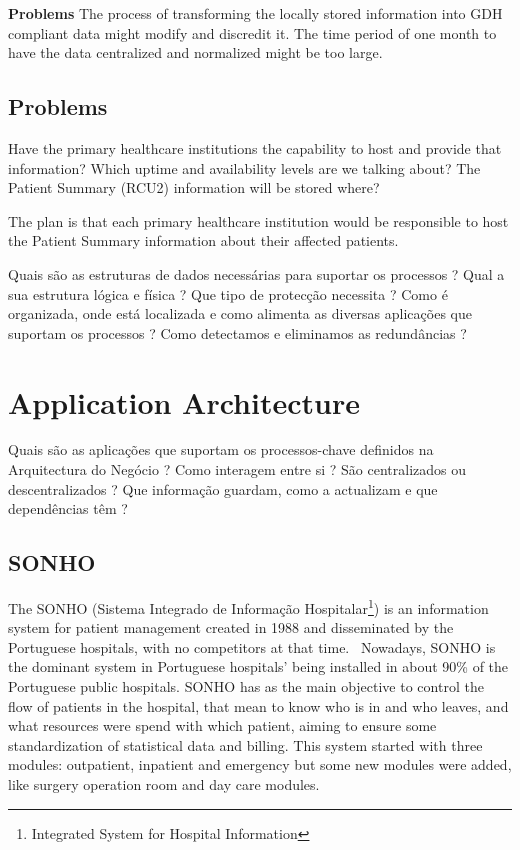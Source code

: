 \textbf{Problems}
The process of transforming the locally stored information into GDH compliant data might modify and discredit it.
The time period of one month to have the data centralized and normalized might be too large.

\subsection{Problems}
Have the primary healthcare institutions the capability to host and provide that information? Which uptime and availability levels are we talking about?
The Patient Summary (RCU2) information will be stored where?

The plan is that each primary healthcare institution would be responsible to host the Patient Summary information about their affected patients.

Quais são as estruturas de dados necessárias para suportar os processos ? Qual a sua estrutura lógica e física ? Que tipo de protecção necessita ? Como é organizada, onde está localizada e como alimenta as diversas aplicações que suportam os processos ? Como detectamos e eliminamos as redundâncias ?


\section{Application Architecture}


Quais são as aplicações que suportam os processos-chave definidos na Arquitectura do Negócio ? Como interagem entre si ? São centralizados ou descentralizados ? Que informação guardam, como a actualizam e que dependências têm ?

\subsection{SONHO}

The SONHO (Sistema Integrado de Informação Hospitalar\footnote{Integrated System for Hospital Information}) is an information system for patient management created in 1988 and disseminated by the Portuguese hospitals, with no competitors at that time.~\citep{Teixeira2005} Nowadays, SONHO is the dominant system in Portuguese hospitals' being installed in about 90\% of the Portuguese public hospitals. SONHO has as the main objective to control the flow of patients in the hospital, that mean to know who is in and who leaves, and what resources were spend with which patient, aiming to ensure some standardization of statistical data and billing. This system started with three modules: outpatient, inpatient and emergency but some new modules were added, like surgery operation room and day care modules.~\citep{Cruz-correia}

